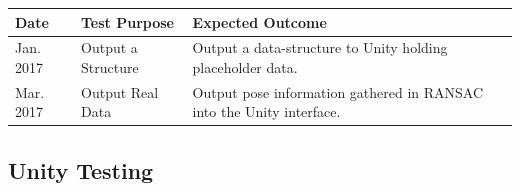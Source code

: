 \documentclass[12pt]{article}
\begin{document}
\begin{longtable}[]{@{}lll@{}}
\toprule
\begin{minipage}[b]{0.06\columnwidth}\raggedright\strut
Date\strut
\end{minipage} & \begin{minipage}[b]{0.16\columnwidth}\raggedright\strut
Test Purpose\strut
\end{minipage} & \begin{minipage}[b]{0.22\columnwidth}\raggedright\strut
Expected Outcome\strut
\end{minipage}\tabularnewline
\midrule
\endhead
\begin{minipage}[t]{0.06\columnwidth}\raggedright\strut
Jan. 2017\strut
\end{minipage} & \begin{minipage}[t]{0.16\columnwidth}\raggedright\strut
Output a Structure\strut
\end{minipage} & \begin{minipage}[t]{0.22\columnwidth}\raggedright\strut
Output a data-structure to Unity holding placeholder data.\strut
\end{minipage}\tabularnewline
\begin{minipage}[t]{0.06\columnwidth}\raggedright\strut
Mar. 2017\strut
\end{minipage} & \begin{minipage}[t]{0.16\columnwidth}\raggedright\strut
Output Real Data\strut
\end{minipage} & \begin{minipage}[t]{0.22\columnwidth}\raggedright\strut
Output pose information gathered in RANSAC into the Unity
interface.\strut
\end{minipage}\tabularnewline
\bottomrule
\end{longtable}

\subsection{Unity Testing}\label{unity-testing}
\end{document}

